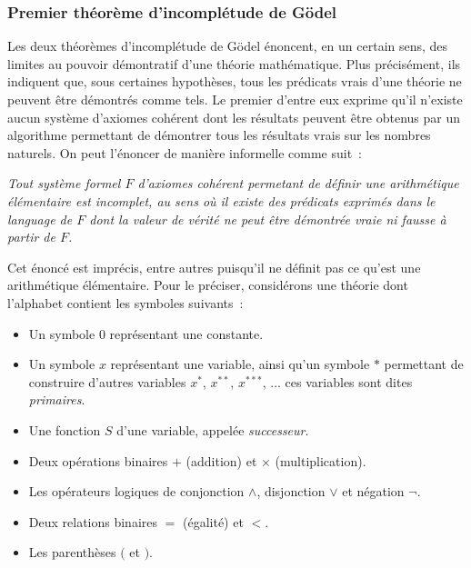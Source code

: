 \subsubsection{Premier théorème d'incomplétude de Gödel}

Les deux théorèmes d'incomplétude de Gödel énoncent, en un certain sens, des limites au pouvoir démontratif d'une théorie mathématique. 
Plus précisément, ils indiquent que, sous certaines hypothèses, tous les prédicats vrais d'une théorie ne peuvent être démontrés comme tels. 
Le premier d'entre eux exprime qu'il n'existe aucun système d'axiomes cohérent dont les résultats peuvent être obtenus par un algorithme permettant de démontrer tous les résultats vrais sur les nombres naturels. 
On peut l'énoncer de manière informelle comme suit : 

\medskip

\noindent \textit{Tout système formel $F$ d'axiomes cohérent permetant de définir une arithmétique élémentaire est incomplet, au sens où il existe des prédicats exprimés dans le language de $F$ dont la valeur de vérité ne peut être démontrée vraie ni fausse à partir de $F$.}

\medskip

\noindent Cet énoncé est imprécis, entre autres puisqu'il ne définit pas ce qu'est une arithmétique élémentaire. 
Pour le préciser, considérons une théorie dont l'alphabet contient les symboles suivants : 
\begin{itemize}[nosep]
    \item Un symbole $0$ représentant une constante. 
    \item Un symbole $x$ représentant une variable, ainsi qu'un symbole $\ast$ permettant de construire d'autres variables $x^\ast$, $x^{\ast\ast}$, $x^{\ast\ast\ast}$, ... ces variables sont dites \emph{primaires}.
    \item Une fonction $S$ d'une variable, appelée \textit{successeur}. 
    \item Deux opérations binaires $+$ (addition) et $\times$ (multiplication).
    \item Les opérateurs logiques de conjonction $\wedge$, disjonction $\vee$ et négation $\neg$.
    \item Deux relations binaires $=$ (égalité) et $<$.
    \item Les parenthèses $($ et $)$.
\end{itemize}

